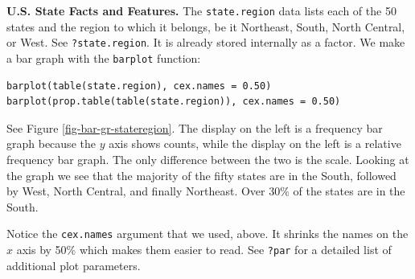 \documentclass[captions=tableheading]{scrbook}
\begin{document}
\begin{example}
\textbf{U.S. State Facts and Features.} The \texttt{state.region} data lists each of the 50 states and the region to which it belongs, be it Northeast, South, North Central, or West. See \texttt{?state.region}. It is already stored internally as a factor. We make a bar graph with the \texttt{barplot} function: 



\begin{verbatim}
barplot(table(state.region), cex.names = 0.50)
barplot(prop.table(table(state.region)), cex.names = 0.50)
\end{verbatim}

See Figure \ref{fig-bar-gr-stateregion}. The display on the left is a frequency bar graph because the \(y\) axis shows counts, while the display on the left is a relative frequency bar graph. The only difference between the two is the scale. Looking at the graph we see that the majority of the fifty states are in the South, followed by West, North Central, and finally Northeast. Over 30\% of the states are in the South.

Notice the \texttt{cex.names} argument that we used, above. It shrinks the names on the \(x\) axis by 50\% which makes them easier to read. See \texttt{?par} for a detailed list of additional plot parameters.








\end{example}
\end{document}
